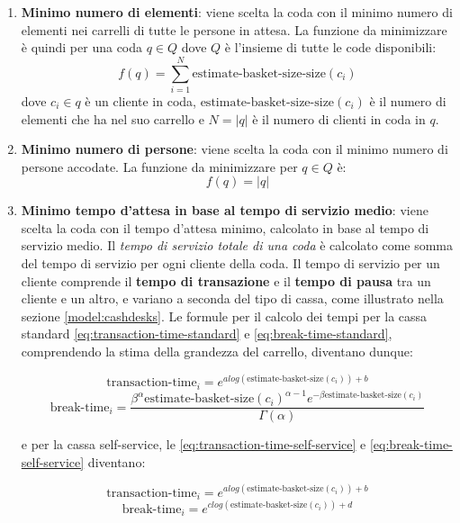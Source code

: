 \begin{enumerate}
\item \textbf{Minimo numero di elementi}: viene scelta la coda con il minimo numero di elementi nei carrelli di tutte le persone in attesa. La funzione da minimizzare è quindi per una coda $q \in Q$ dove $Q$ è l'insieme di tutte le code disponibili:
\begin{equation}
f(q) = \sum\limits_{i=1}^N \text{estimate-basket-size-size}(c_i) 
\end{equation}
dove $c_i \in q$ è un cliente in coda, $\text{estimate-basket-size-size}(c_i)$ è il numero di elementi che ha nel suo carrello e $N = |q|$ è il numero di clienti in coda in $q$.
\item \textbf{Minimo numero di persone}: viene scelta la coda con il minimo numero di persone accodate. La funzione da minimizzare per $q \in Q$ è:
\begin{equation}
f(q) = |q|
\end{equation}
\item \textbf{Minimo tempo d'attesa in base al tempo di servizio medio}:
viene scelta la coda con il tempo d'attesa minimo, calcolato in base al tempo di servizio medio.
Il \textit{tempo di servizio totale di una coda} è calcolato come somma del tempo di servizio per ogni cliente della coda. Il tempo di servizio per un cliente comprende il \textbf{tempo di transazione} e il \textbf{tempo di pausa} tra un cliente e un altro, e variano a seconda del tipo di cassa, come illustrato nella sezione \ref{model:cashdesks}. Le formule per il calcolo dei tempi per la cassa standard \ref{eq:transaction-time-standard} e \ref{eq:break-time-standard}, comprendendo la stima della grandezza del carrello, diventano dunque:

\begin{equation}\label{eq:transaction-time-standard-estimate}
\text{transaction-time}_i = e^{a log(\text{estimate-basket-size}(c_i)) + b}
\end{equation}
\begin{equation}\label{eq:break-time-standard-estimate}
\text{break-time}_i = \frac{\beta^{\alpha} \text{estimate-basket-size}(c_i)^{\alpha - 1} e^{- \beta \text{estimate-basket-size}(c_i)}}{\Gamma (\alpha)}
\end{equation}

e per la cassa self-service, le \ref{eq:transaction-time-self-service} e \ref{eq:break-time-self-service} diventano: 

\begin{equation}\label{eq:transaction-time-self-service-estimate}
\text{transaction-time}_i = e^{a log(\text{estimate-basket-size}(c_i)) + b}
\end{equation}
\begin{equation}\label{eq:break-time-self-service-estimate}
\text{break-time}_i = e^{c log(\text{estimate-basket-size}(c_i)) + d}
\end{equation}


\end{enumerate}
